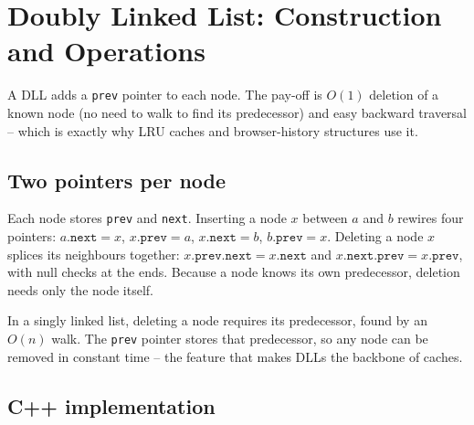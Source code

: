\section{Doubly Linked List: Construction and Operations}
\label{sec:ll-doubly-basics}


\begin{patternbox}
A DLL adds a \texttt{prev} pointer to each node. The pay-off is $O(1)$
deletion of a known node (no need to walk to find its predecessor) and easy
backward traversal -- which is exactly why LRU caches and browser-history
structures use it.
\end{patternbox}

\subsection*{Two pointers per node}

Each node stores \texttt{prev} and \texttt{next}. Inserting a node $x$
between $a$ and $b$ rewires four pointers: $a.\texttt{next}=x$,
$x.\texttt{prev}=a$, $x.\texttt{next}=b$, $b.\texttt{prev}=x$. Deleting a
node $x$ splices its neighbours together: $x.\texttt{prev}.\texttt{next}=
x.\texttt{next}$ and $x.\texttt{next}.\texttt{prev}=x.\texttt{prev}$, with
null checks at the ends. Because a node knows its own predecessor, deletion
needs only the node itself.

\begin{ideabox}
In a singly linked list, deleting a node requires its predecessor, found by
an $O(n)$ walk. The \texttt{prev} pointer stores that predecessor, so any
node can be removed in constant time -- the feature that makes DLLs the
backbone of caches.
\end{ideabox}

\subsection*{C++ implementation}

